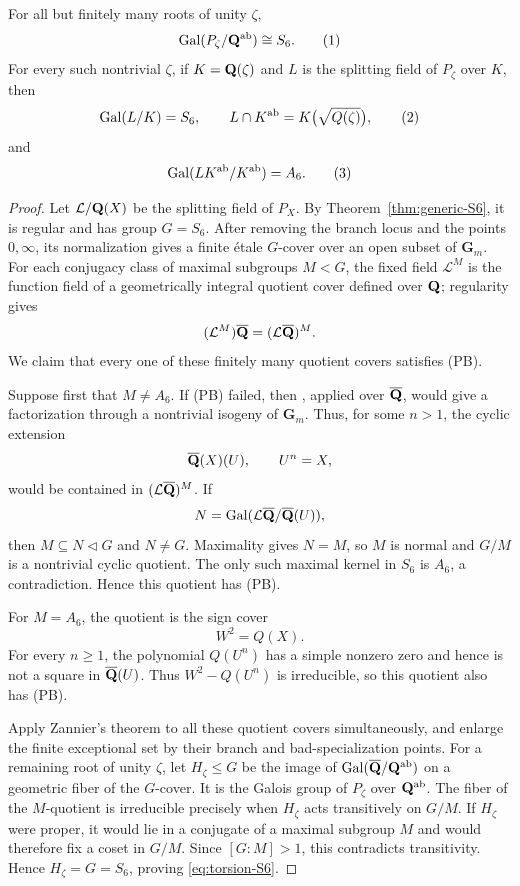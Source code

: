 \begin{theorem}
\label{thm:cofinite-torsion-S6}
For all but finitely many roots of unity $\zeta$,
\[
 \Gal(P_\zeta/\Q^{\mathrm{ab}})\cong S_6.
 \numberthis\label{eq:torsion-S6}
\]
For every such nontrivial $\zeta$, if $K=\mathbf Q(\zeta)$ and $L$ is the
splitting field of $P_\zeta$ over $K$, then
\[
 \Gal(L/K)=S_6,\qquad
 L\cap K^{\mathrm{ab}}=K\bigl(\sqrt{Q(\zeta)}\bigr),
 \numberthis\label{eq:sign-intersection}
\]
and
\[
 \Gal(LK^{\mathrm{ab}}/K^{\mathrm{ab}})=A_6.
 \numberthis\label{eq:A6-over-Kab}
\]
\end{theorem}

\begin{proof}
Let $\mathcal L/\mathbf Q(X)$ be the splitting field of $P_X$.  By
Theorem~\ref{thm:generic-S6}, it is regular and has group $G=S_6$.
After removing the branch locus and the points $0,\infty$, its
normalization gives a finite \'etale $G$-cover over an open subset of
$\mathbf G_m$.  For each conjugacy class of maximal subgroups $M<G$,
the fixed field $\mathcal L^M$ is the function field of a geometrically
integral quotient cover defined over $\mathbf Q$; regularity gives
\[
 (\mathcal L^M)\overline{\mathbf Q}=(\mathcal L\overline{\mathbf Q})^M.
\]
We claim that every one of these finitely many quotient covers satisfies
(PB).

Suppose first that $M\ne A_6$.  If (PB) failed, then
\cite[Proposition 2.1]{Zannier2010}, applied over $\overline{\mathbf Q}$, would
give a factorization through a nontrivial isogeny of $\mathbf G_m$.
Thus, for some $n>1$, the cyclic extension
\[
 \overline{\mathbf Q}(X)(U),\qquad U^n=X,
\]
would be contained in $(\mathcal L\overline{\mathbf Q})^M$.  If
\[
 N=\operatorname{Gal}(\mathcal L\overline{\mathbf Q}/\overline{\mathbf Q}(U)),
\]
then $M\subseteq N\lhd G$ and $N\ne G$.  Maximality gives $N=M$, so
$M$ is normal and $G/M$ is a nontrivial cyclic quotient.  The only such
maximal kernel in $S_6$ is $A_6$, a contradiction.  Hence this quotient
has (PB).

For $M=A_6$, the quotient is the sign cover
\[
 W^2=Q(X).
\]
For every $n\ge1$, the polynomial $Q(U^n)$ has a simple nonzero zero
and hence is not a square in $\overline{\mathbf Q}(U)$.  Thus
$W^2-Q(U^n)$ is irreducible, so this quotient also has (PB).

Apply Zannier's theorem \cite[Theorem 2.1]{Zannier2010} to all these
quotient covers simultaneously, and enlarge the finite exceptional set
by their branch and bad-specialization points.  For a remaining root of
unity $\zeta$, let $H_\zeta\le G$ be the image of
$\operatorname{Gal}(\overline{\mathbf Q}/\mathbf Q^{\mathrm{ab}})$ on a geometric
fiber of the $G$-cover.  It is the Galois group of $P_\zeta$ over
$\mathbf Q^{\mathrm{ab}}$.  The fiber of the $M$-quotient is irreducible
precisely when $H_\zeta$ acts transitively on $G/M$.  If $H_\zeta$ were
proper, it would lie in a conjugate of a maximal subgroup $M$ and would
therefore fix a coset in $G/M$.  Since $[G:M]>1$, this contradicts
transitivity.  Hence $H_\zeta=G=S_6$, proving
\eqref{eq:torsion-S6}.


\end{proof}
